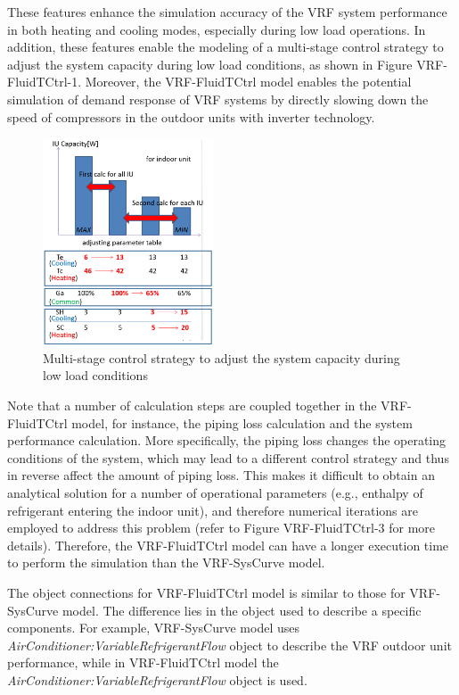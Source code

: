 These features enhance the simulation accuracy of the VRF system performance in both heating and cooling modes, especially during low load operations. In addition, these features enable the modeling of a multi-stage control strategy to adjust the system capacity during low load conditions, as shown in Figure VRF-FluidTCtrl-1. Moreover, the VRF-FluidTCtrl model enables the potential simulation of demand response of VRF systems by directly slowing down the speed of compressors in the outdoor units with inverter technology.

\begin{figure}[hbtp] %
\centering
\includegraphics[width=0.45\textwidth, height=0.45\textheight, keepaspectratio=true]{media/VRF-FluidTCtrl-1a.png}
\caption{Multi-stage control strategy to adjust the system capacity during low load conditions \label{fig:multi-stage-control-strategy-to-adjust-the-system-capacity-during-low-load-conditions}}
\end{figure}

Note that a number of calculation steps are coupled together in the VRF-FluidTCtrl model, for instance, the piping loss calculation and the system performance calculation. More specifically, the piping loss changes the operating conditions of the system, which may lead to a different control strategy and thus in reverse affect the amount of piping loss. This makes it difficult to obtain an analytical solution for a number of operational parameters (e.g., enthalpy of refrigerant entering the indoor unit), and therefore numerical iterations are employed to address this problem (refer to Figure VRF-FluidTCtrl-3 for more details). Therefore, the VRF-FluidTCtrl model can have a longer execution time to perform the simulation than the VRF-SysCurve model. 

The object connections for VRF-FluidTCtrl model is similar to those for VRF-SysCurve model. The difference lies in the object used to describe a specific components. For example, VRF-SysCurve model uses \emph{AirConditioner:VariableRefrigerantFlow} object to describe the VRF outdoor unit performance, while in VRF-FluidTCtrl model the \emph{AirConditioner:VariableRefrigerantFlow} object is used.

